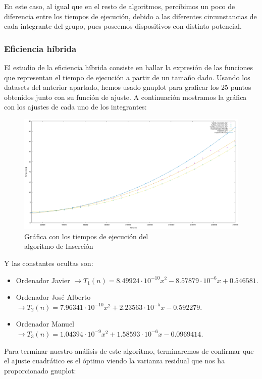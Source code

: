 \documentclass[10pt,a4paper]{article}
\begin{document}
En este caso, al igual que en el resto de algoritmos, percibimos un poco de diferencia entre los tiempos de ejecución, debido a las diferentes circunstancias de cada integrante del grupo, pues poseemos dispositivos con distinto potencial.

\subsubsection{Eficiencia híbrida}
El estudio de la eficiencia híbrida consiste en hallar la expresión de las funciones que representan el tiempo de ejecución a partir de un tamaño dado. Usando los datasets del anterior apartado, hemos usado gnuplot para graficar los 25 puntos obtenidos junto con su función de ajuste. A continuación mostramos la gráfica con los ajustes de cada uno de los integrantes:

\begin{figure}[h!]
	\centering
	\includegraphics[scale=0.16]{../../Images/Insercion_combinados.png}
	\caption{Gráfica con los tiempos de ejecución del \\algoritmo de Inserción}
\end{figure}

Y las constantes ocultas son:

\begin{itemize}
	\item Ordenador Javier \(\rightarrow T_1(n) = 8.49924 \cdot 10^{-10} x^2 - 8.57879 \cdot 10^{-6} x + 0.546581\).
	\item Ordenador José Alberto \(\rightarrow T_2(n) = 7.96341 \cdot 10^{-10} x^2 + 2.23563 \cdot 10^{-5} x - 0.592279\).
	\item Ordenador Manuel \(\rightarrow T_3(n) = 1.04394 \cdot 10^{-9} x^2 + 1.58593 \cdot 10^{-6} x - 0.0969414\).
\end{itemize}

Para terminar nuestro análisis de este algoritmo, terminaremos de confirmar que el ajuste cuadrático es el óptimo viendo la varianza residual que nos ha proporcionado gnuplot:
\end{document}
